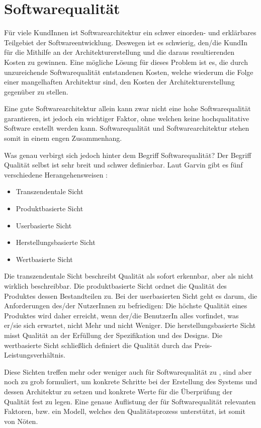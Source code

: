 \chapter{Softwarequalität}
Für viele KundInnen ist Softwarearchitektur ein schwer einorden- und erklärbares Teilgebiet der Softwareentwicklung. Deswegen ist es schwierig, den/die KundIn für die Mithilfe an der Architekturerstellung und die daraus resultierenden Kosten zu gewinnen. Eine mögliche Lösung für dieses Problem ist es, die durch unzureichende Softwarequalität entstandenen Kosten, welche wiederum die Folge einer mangelhaften Architektur sind, den Kosten der Architekturerstellung gegenüber zu stellen.  \cite[S. 8-9]{softarch}


Eine gute Softwarearchitektur allein kann zwar nicht eine hohe Softwarequalität garantieren, ist jedoch ein wichtiger Faktor, ohne welchen keine hochqualitative Software erstellt werden kann. Softwarequalität und Softwarearchitektur stehen somit in einem engen Zusammenhang. \cite[S. 8-9]{softarch}

Was genau verbirgt sich jedoch hinter dem Begriff Softwarequalität? Der Begriff Qualität selbst ist sehr breit und schwer definierbar. Laut Garvin gibt es fünf verschiedene Herangehensweisen \cite[S. 25-29]{quality}:

\begin{itemize}
  \item Transzendentale Sicht
  \item Produktbasierte Sicht
  \item Userbasierte Sicht
  \item Herstellungsbasierte Sicht
  \item Wertbasierte Sicht
\end{itemize}

Die transzendentale Sicht beschreibt Qualität als sofort erkennbar, aber als nicht wirklich beschreibbar. Die produktbasierte Sicht ordnet die Qualität des Produktes dessen Bestandteilen zu. Bei der userbasierten Sicht geht es darum, die Anforderungen des/der NutzerInnen zu befriedigen: Die höchste Qualität eines Produktes wird daher erreicht, wenn der/die BenutzerIn alles vorfindet, was er/sie sich erwartet, nicht Mehr und nicht Weniger. Die herstellungsbasierte Sicht misst Qualität an der Erfüllung der Spezifikation und des Designs. Die wertbasierte Sicht schließlich definiert die Qualität durch das Preis-Leistungsverhältnis. \cite[S. 26]{quality}

Diese Sichten treffen mehr oder weniger auch für Softwarequalität zu \cite[S. 399]{pract}, sind aber noch zu grob formuliert, um konkrete Schritte bei der Erstellung des Systems und dessen Architektur zu setzen und konkrete Werte für die Überprüfung der Qualität fest zu legen. Eine genaue Auflistung der für Softwarequalität relevanten Faktoren, bzw. ein Modell, welches den Qualitätsprozess unterstützt, ist somit von Nöten.

